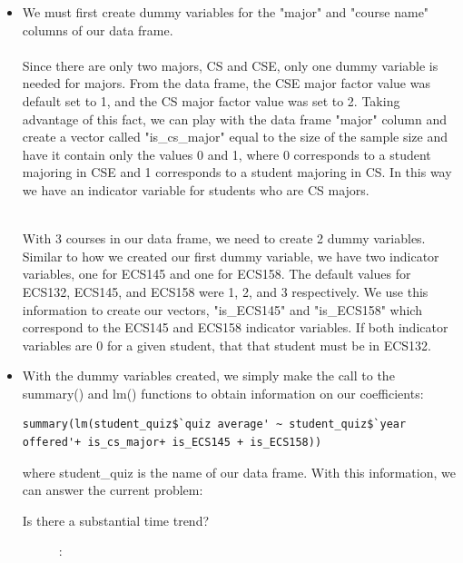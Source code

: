 \documentclass{article}
\begin{document}
            \begin{itemize}
                \item We must first create dummy variables for the "major" and "course name" columns of our data frame. 
\\\\Since there are only two majors, CS and CSE, only one dummy variable is needed for majors. From the data frame, the CSE major factor value was default set to 1, and the CS major factor value was set to 2. Taking advantage of this fact, we can play with the data frame "major" column and create a vector called "is\_cs\_major" equal to the size of the sample size and have it contain only the values 0 and 1, where 0 corresponds to a student majoring in CSE and 1 corresponds to a student majoring in CS. In this way we have an indicator variable for students who are CS majors. 
                    
 \\With 3 courses in our data frame, we need to create 2 dummy variables. Similar to how we created our first dummy variable, we have two indicator variables, one for ECS145 and one for ECS158. The default values for ECS132, ECS145, and ECS158 were 1, 2, and 3 respectively. We use this information to create our vectors, "is\_ECS145" and "is\_ECS158" which correspond to the ECS145 and ECS158 indicator variables. If both indicator variables are 0 for a given student, that that student must be in ECS132.

                
                \item With the dummy variables created, we simply make the call to the summary() and lm() functions to obtain information on our coefficients:
                
\lstset{breaklines=true}
\begin{lstlisting}[math escape]
summary(lm(student_quiz$`quiz average' ~ student_quiz$`year offered'+ is_cs_major+ is_ECS145 + is_ECS158))
\end{lstlisting}

                where student\_quiz is the name of our data frame.
                With this information, we can answer the current problem:
                
                \begin{description}
                    \item[Is there a substantial time trend?] :
                    

\end{description}
\end{itemize}
\end{document}
